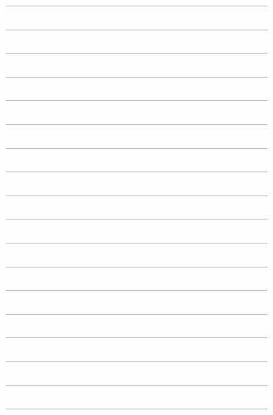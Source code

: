 --------------------------------------------------------------------------------



--------------------------------------------------------------------------------



--------------------------------------------------------------------------------



--------------------------------------------------------------------------------



--------------------------------------------------------------------------------



--------------------------------------------------------------------------------



--------------------------------------------------------------------------------



--------------------------------------------------------------------------------



--------------------------------------------------------------------------------



--------------------------------------------------------------------------------



--------------------------------------------------------------------------------



--------------------------------------------------------------------------------



--------------------------------------------------------------------------------



--------------------------------------------------------------------------------



--------------------------------------------------------------------------------



--------------------------------------------------------------------------------



--------------------------------------------------------------------------------



--------------------------------------------------------------------------------
